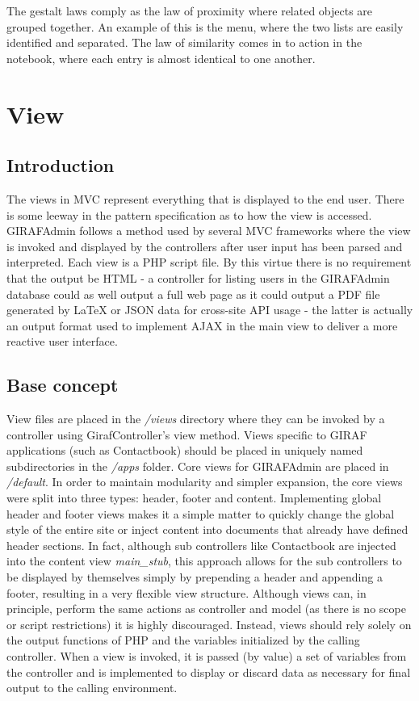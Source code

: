 The gestalt laws comply as the law of proximity where related objects are grouped together. An example of this is the menu, where the two lists are easily identified and separated. The law of similarity comes in to action in the notebook, where each entry is almost identical to one another.


\section{View}
\subsection{Introduction}
The views in MVC represent everything that is displayed to the end user. There is some leeway in the pattern specification as to how the view is accessed. GIRAFAdmin follows a method used by several MVC frameworks where the view is invoked and displayed by the controllers after user input has been parsed and interpreted. Each view is a PHP script file. By this virtue there is no requirement that the output be HTML - a controller for listing users in the GIRAFAdmin database could as well output a full web page as it could output a PDF file generated by LaTeX or JSON data for cross-site API usage - the latter is actually an output format used to implement AJAX in the main view to deliver a more reactive user interface.

\subsection{Base concept}
View files are placed in the \emph{/views} directory where they can be invoked by a controller using GirafController's view method. Views specific to GIRAF applications (such as Contactbook) should be placed in uniquely named subdirectories in the \emph{/apps} folder. Core views for GIRAFAdmin are placed in \emph{/default}.
In order to maintain modularity and simpler expansion, the core views were split into three types: header, footer and content. Implementing global header and footer views makes it a simple matter to quickly change the global style of the entire site or inject content into documents that already have defined header sections. In fact, although sub controllers like Contactbook are injected into the content view \emph{main\_stub}, this approach allows for the sub controllers to be displayed by themselves simply by prepending a header and appending a footer, resulting in a very flexible view structure.
Although views can, in principle, perform the same actions as controller and model (as there is no scope or script restrictions) it is highly discouraged. Instead, views should rely solely on the output functions of PHP and the variables initialized by the calling controller. When a view is invoked, it is passed (by value) a set of variables from the controller and is implemented to display or discard data as necessary for final output to the calling environment.

